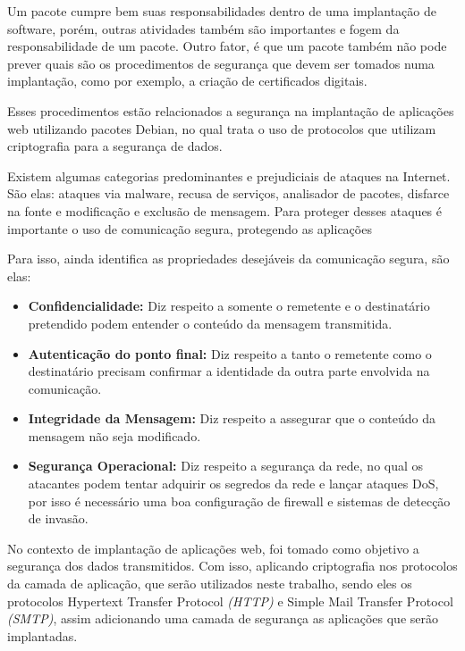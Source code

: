 Um pacote cumpre bem suas responsabilidades dentro de uma implantação de
software, porém, outras atividades também são importantes e fogem da responsabilidade 
de um pacote. Outro fator, é que um pacote também não pode prever quais são
os procedimentos de segurança que devem ser tomados numa implantação, como por 
exemplo, a criação de certificados digitais. 

Esses procedimentos estão relacionados a segurança na implantação de aplicações web 
utilizando pacotes Debian, no qual trata o uso de protocolos que utilizam criptografia
para a segurança de dados.

Existem algumas categorias predominantes e prejudiciais de ataques na Internet. São elas: 
ataques via malware, recusa de serviços, analisador
de pacotes, disfarce na fonte e modificação e exclusão de mensagem. Para proteger
desses ataques é importante o uso de comunicação segura, protegendo as aplicações 
\cite{kurose2010redes} 

Para isso,  ainda identifica as propriedades 
desejáveis da comunicação segura, são elas:

\begin{itemize}
  \item \textbf{Confidencialidade:} Diz respeito a somente o remetente e o destinatário
  pretendido podem entender o conteúdo da mensagem transmitida.
  \item \textbf{Autenticação do ponto final:} Diz respeito a tanto o remetente como o destinatário
  precisam confirmar a identidade da outra parte envolvida na comunicação.
  \item \textbf{Integridade da Mensagem:} Diz respeito a assegurar que o conteúdo
  da mensagem não seja modificado.
  \item \textbf{Segurança Operacional:} Diz respeito a segurança da rede, no qual
  os atacantes podem tentar adquirir os segredos da rede e lançar ataques DoS,
  por isso é necessário uma boa configuração de firewall e sistemas de detecção
  de invasão.
\end{itemize}

No contexto de implantação de aplicações web, foi tomado como objetivo a segurança
dos dados transmitidos. Com isso, aplicando criptografia nos protocolos da camada
de aplicação, que serão utilizados neste trabalho, sendo eles os protocolos 
Hypertext Transfer Protocol \textit{(HTTP)} e Simple Mail Transfer Protocol 
\textit{(SMTP)}, assim adicionando uma camada de segurança as aplicações que serão implantadas.

